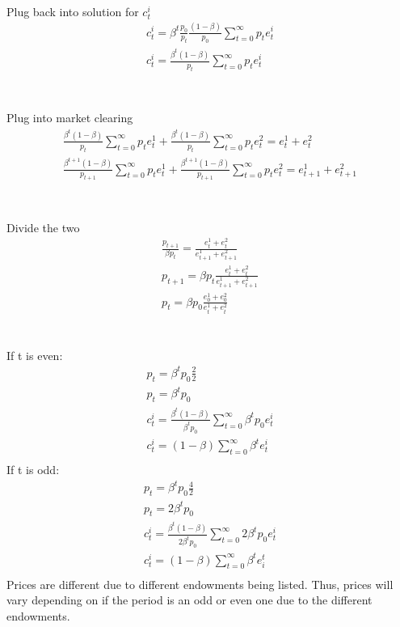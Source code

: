 \documentclass[10pt, a4paper]{article}
\begin{document}
      \\
      Plug back into solution for $c_t^i$
      \begin{gather*}
        c_t^i =\beta^t \frac{p_0}{p_t}\frac{(1-\beta)}{p_0}\sum\limits_{t=0}^{\infty}p_te_t^i \\
        c_t^i = \frac{\beta^t(1-\beta)}{p_t}\sum\limits_{t=0}^{\infty}p_te_t^i\\
      \end{gather*} \\
      \\
      Plug into market clearing
      \begin{gather*}
        \frac{\beta^t(1-\beta)}{p_t}\sum\limits_{t=0}^{\infty}p_te_t^1 + \frac{\beta^t(1-\beta)}{p_t}\sum\limits_{t=0}^{\infty}p_te_t^2 = e_t^1+e_t^2 \\
        \frac{\beta^{t+1}(1-\beta)}{p_{t+1}}\sum\limits_{t=0}^{\infty}p_{t}e_{t}^1 + \frac{\beta^{t+1}(1-\beta)}{p_{t+1}}\sum\limits_{t=0}^{\infty}p_te_{t}^2 = e_{t+1}^1 + e_{t+1}^2 \\
      \end{gather*} \\
      \\
      Divide the two
      \begin{gather*}
        \frac{p_{t+1}}{\beta p_t} = \frac{e_t^1+e_t^2}{e_{t+1}^1+e_{t+1}^2} \\
        p_{t+1} = \beta p_t\frac{e_t^1+e_t^2}{e_{t+1}^1+e_{t+1}^2} \\
        \boxed{p_t = \beta p_0\frac{e_0^1+e_0^2}{e_{t}^1+e_{t}^2}}
      \end{gather*} \\
      \\
      If t is even:
      \begin{gather*}
        p_t = \beta^tp_0\frac{2}{2} \\
        \boxed{p_t = \beta^tp_0} \\
        c_t^i = \frac{\beta^t(1-\beta)}{\beta^tp_0}\sum\limits_{t=0}^{\infty}\beta^tp_0e_t^i \\
        c_t^i = (1-\beta)\sum\limits_{t=0}^{\infty}\beta^te_t^i \\
      \end{gather*}
      If t is odd: 
      \begin{gather*}
        p_t = \beta^tp_0\frac{4}{2} \\
        \boxed{p_t = 2\beta^tp_0} \\
        c_t^i = \frac{\beta^t(1-\beta)}{2\beta^tp_0}\sum\limits_{t=0}^{\infty}2\beta^tp_0e_t^i \\
        c_t^i = (1-\beta)\sum\limits_{t=0}^{\infty}\beta^te_i^t \\
      \end{gather*}
      Prices are different due to different endowments being listed. Thus, prices will vary depending on if the period is an odd or even one due to the different endowments.
\end{document}
